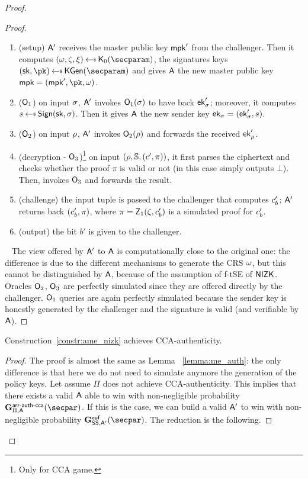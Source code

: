 \begin{proof}
\begin{lemma}
\begin{proof}
            \begin{enumerate}
                \item (setup) $\mathsf{A}'$ receives the master public key $\mathsf{mpk}'$ from the challenger. Then it computes $(\crs,\tpsim,\tpext)\getsr\nizkext_0(\secparam)$, the signatures keys $(\sk, \pk) \getsr \kgen(\secparam)$ and gives $\mathsf{A}$ the new master public key $\mpk = (\mpk', \pk, \crs)$.
                \item ($\mathsf{O}_1$) on input $\sigma$, $\mathsf{A}'$ invokes $\mathsf{O}_1(\sigma)$ to have back $\mathsf{ek}'_\sigma$; moreover, it computes $\signature \getsr \sign(\sk, \sattr)$. Then it gives $\mathsf{A}$ the new sender key $\mathsf{ek}_\sigma = (\mathsf{ek}'_\sigma, s)$.
                \item ($\mathsf{O}_2$) on input $\rho$, $\mathsf{A}'$ invokes $\mathsf{O}_2(\rho)$ and forwards the received $\mathsf{ek}'_\rho$.
                \item (decryption - $\mathsf{O}_3$)\footnote{Only for CCA game.} on input $(\rho, \mathbb{S}, (c', \pi))$, it first parses the ciphertext and checks whether the proof $\pi$ is valid or not (in this case simply outputs $\bot$). Then, invokes $\mathsf{O}_3$ and forwards the result.
                \item (challenge) the input tuple is passed to the challenger that computes $c'_b$; $\mathsf{A}'$ returns back $(c'_b, \pi)$, where $\pi = \mathsf{Z}_1(\zeta, c'_b)$ is a simulated proof for $c'_b$.
                \item (output) the bit $b'$ is given to the challenger.
            \end{enumerate}
            ~\newline
            The view offered by $\mathsf{A}'$ to $\mathsf{A}$ is computationally close to the original one: the difference is due to the different mechanisms to generate the CRS $\omega$, but this cannot be distinguished by $\mathsf{A}$, because of the assumption of f-tSE of $\mathsf{NIZK}$.
            Oracles $\mathsf{O}_2$, $\mathsf{O}_3$ are perfectly simulated since they are offered directly by the challenger.
            $\mathsf{O}_1$ queries are again perfectly simulated because the sender key is honestly generated by the challenger and the signature is valid (and verifiable by $\mathsf{A}$).
        \end{proof}
    \end{lemma}

    \begin{lemma}\label{lemma:ame_auth}
        Construction~\ref{constr:ame_nizk} achieves CCA-authenticity.
        \begin{proof}
            The proof is almost the same as Lemma ~\ref{lemma:me_auth}: the only difference is that here we do not need to simulate anymore the generation of the policy keys.
            Let assume $\Pi$ does not achieve CCA-authenticity. This implies that there exists a valid $\mathsf{A}$ able to win with non-negligible probability $\NISHeufgamecca{\arranged}_{\Pi, \adversary}(\secpar)$. If this is the case, we can build a valid $\mathsf{A}'$ to win with non-negligible probability $\Sigeufgame_{\sig, \adversary'}(\secpar)$. The reduction is the following.


\end{proof}
\end{lemma}
\end{proof}
